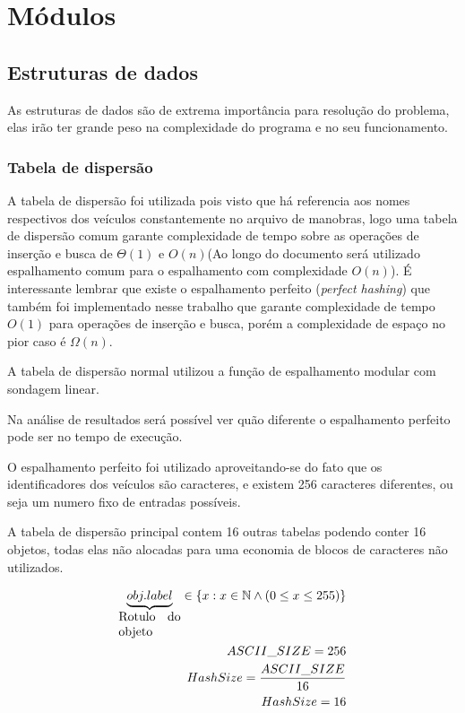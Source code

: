 \documentclass[11pt]{article}
\begin{document}
\newpage
\section{Módulos}
\label{sec:orga92d9c7}
\subsection{Estruturas de dados}
\label{sec:org5b1d6c4}
As estruturas de dados são de extrema importância para resolução do problema, elas irão ter grande peso na complexidade do programa e no seu funcionamento.
\subsubsection{Tabela de dispersão}
\label{sec:org5df7046}
A tabela de dispersão \cite{hashingusp} foi utilizada pois visto que há referencia aos nomes respectivos dos veículos constantemente no arquivo de manobras, logo uma tabela de dispersão comum garante complexidade de tempo sobre as operações de inserção e busca de \(\Theta(1)\) e \(O(n)\)(Ao longo do documento será utilizado espalhamento comum para o espalhamento com complexidade \(O(n)\)). É interessante lembrar que existe o espalhamento perfeito (\emph{perfect hashing}) \cite{cormen09_introd} que também foi implementado nesse trabalho que garante complexidade de tempo \(O(1)\) para operações de inserção e busca, porém a complexidade de espaço no pior caso é \(\Omega(n)\). 

A tabela de dispersão normal utilizou a função de espalhamento modular com sondagem linear.

Na análise de resultados será possível ver quão diferente o espalhamento perfeito pode ser no tempo de execução.

O espalhamento perfeito foi utilizado aproveitando-se do fato que os identificadores dos veículos são caracteres, e existem 256 caracteres diferentes, ou seja um numero fixo de entradas possíveis.

A tabela de dispersão principal contem 16 outras tabelas podendo conter 16 objetos, todas elas não alocadas para uma economia de blocos de caracteres não utilizados. 

\begin{equation}\label{eq:HashSize}
\begin{aligned}
\underbrace{obj.label}_{\parbox{1.75cm}{ Rotulo do objeto}} \in \{x : x \in \mathbb{N} \land (0 \leq x \leq 255)\}\\
ASCII\_SIZE = 256\\
HashSize = \frac{ASCII\_SIZE}{16}\\
HashSize = 16\\
\end{aligned}
\end{equation}
\end{document}
